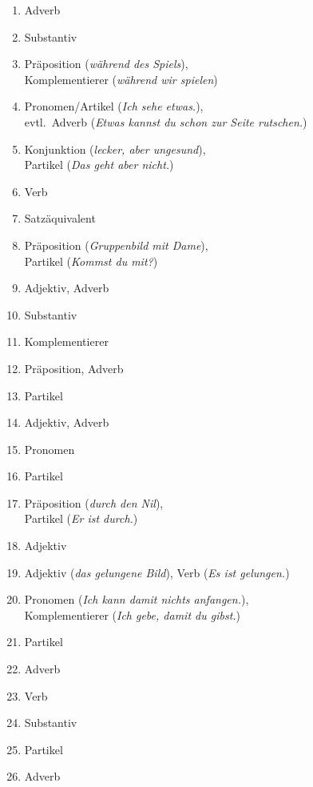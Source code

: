 \begin{enumerate}\Lf
  \item Adverb
  \item Substantiv
  \item Präposition (\textit{während des Spiels}),\\
    Komplementierer (\textit{während wir spielen})
  \item Pronomen\slash Artikel (\textit{Ich sehe etwas.}),\\
    evtl.\ Adverb (\textit{Etwas kannst du schon zur Seite rutschen.})
  \item Konjunktion (\textit{lecker, aber ungesund}),\\
    Partikel (\textit{Das geht aber nicht.})
  \item Verb
  \item Satzäquivalent
  \item Präposition (\textit{Gruppenbild mit Dame}),\\
    Partikel (\textit{Kommst du mit?})
  \item Adjektiv, Adverb
  \item Substantiv
  \item Komplementierer
  \item Präposition, Adverb
  \item Partikel
  \item Adjektiv, Adverb
  \item Pronomen
  \item Partikel
  \item Präposition (\textit{durch den Nil}),\\
    Partikel (\textit{Er ist durch.})
  \item Adjektiv
  \item Adjektiv (\textit{das gelungene Bild}), Verb (\textit{Es ist gelungen.})
  \item Pronomen (\textit{Ich kann damit nichts anfangen.}),\\
    Komplementierer (\textit{Ich gebe, damit du gibst.})
  \item Partikel
  \item Adverb
  \item Verb
  \item Substantiv
  \item Partikel
  \item Adverb
\end{enumerate}



